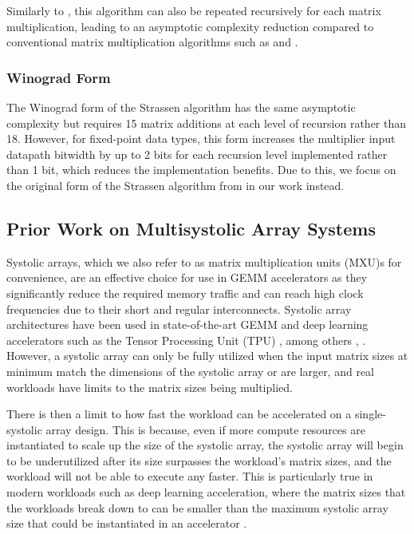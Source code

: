 Similarly to , this algorithm can also be repeated recursively for each matrix \block multiplication, leading to an asymptotic complexity reduction compared to conventional matrix multiplication algorithms such as  and .

\subsubsection{Winograd Form}
The Winograd form of the Strassen algorithm \cite{winograd1971multiplication} has the same asymptotic complexity but requires 15 matrix \block additions at each level of recursion rather than 18.
However, for fixed-point data types, this form increases the multiplier input datapath bitwidth by up to 2 bits for each recursion level implemented rather than 1 bit, which reduces the implementation benefits.
Due to this, we focus on the original form of the Strassen algorithm from \seq in our work instead.

\subsection{Prior Work on Multisystolic Array Systems}
\label{multi-sys}
Systolic arrays, which we also refer to as matrix multiplication units (MXU)s for convenience, are an effective choice for use in GEMM accelerators as they significantly reduce the required memory traffic and can reach high clock frequencies due to their short and regular interconnects.
Systolic array architectures have been used in state-of-the-art GEMM and deep learning accelerators such as the Tensor Processing Unit (TPU) \citeTPU, among others \cite{pogue2024fast}, \cite{zhang2019caffeine}.
However, a systolic array can only be fully utilized when the input matrix sizes at minimum match the dimensions of the systolic array or are larger, and real workloads have limits to the matrix sizes being multiplied.

There is then a limit to how fast the workload can be accelerated on a single-systolic array design.
This is because, even if more compute resources are instantiated to scale up the size of the systolic array, the systolic array will begin to be underutilized after its size surpasses the workload's matrix sizes, and the workload will not be able to execute any faster.
This is particularly true in modern workloads such as deep learning acceleration, where the matrix sizes that the workloads break down to can be smaller than the maximum systolic array size that could be instantiated in an accelerator \citeMultiSys.

